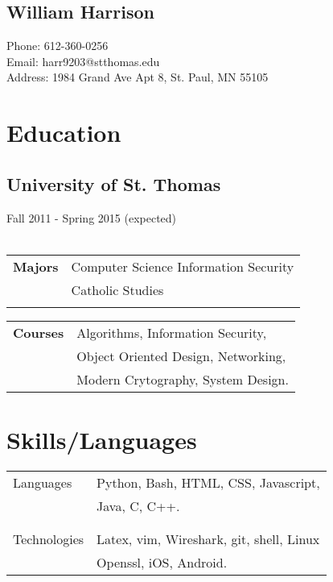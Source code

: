 \documentclass{article}[11pt]
\begin{document}
\setlength{\parskip}{0pt}


\begin{multicols}{2}
	{\section*{\Huge{William Harrison}}}
	\columnbreak
	\begin{flushleft}
		Phone: 612-360-0256 \\
		Email: harr9203@stthomas.edu \\
		Address: 1984 Grand Ave Apt 8, St. Paul, MN 55105
	\end{flushleft}
\end{multicols}
\begin{multicols}{2}
	\section*{Education}
	\subsection*{University of St. Thomas}
	Fall 2011 - Spring 2015 (expected)\\\\
	\begin{tabular}{@{}p{1.5cm}l}
	\textbf{Majors}		& Computer Science Information Security\\
				& Catholic Studies\\\\
	\end{tabular}
	\noindent
	\begin{tabular}{@{}p{1.5cm}l}
	\noindent\textbf{Courses}	& Algorithms, Information Security, \\
				& Object Oriented Design, Networking, \\
				& Modern Crytography, System Design. \\
	\end{tabular}
		\vfill
		\columnbreak
	\section*{Skills/Languages}
	\begin{tabular}{@{}p{2cm}l}
	Languages	& Python, Bash, HTML, CSS, Javascript, \\ 
			& Java, C, C++. \\\\\\
	Technologies	& Latex, vim, Wireshark, git, shell, Linux \\
			& Openssl, iOS, Android. \\
	\end{tabular}
		\vfill
		\columnbreak
\end{multicols}
\end{document}
